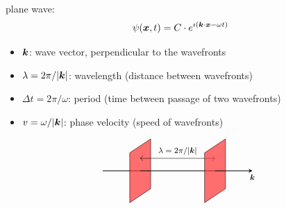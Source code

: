 plane wave:
\begin{equation}\label{eq:plane-wave}
\psi({\boldsymbol{x}}, t) = C \cdot e^{\imath ({\boldsymbol{k}} \cdot {\boldsymbol{x}} - \omega t)}
\end{equation}
\begin{itemize}
\item ${\boldsymbol{k}}$: wave vector, perpendicular to the wavefronts
\item $\lambda = 2 \pi / |{\boldsymbol{k}}|$: wavelength (distance between wavefronts)
\item $\Delta t = 2 \pi / \omega$: period (time between passage of two wavefronts)
\item $v = \omega / |{\boldsymbol{k}}|$: phase velocity (speed of wavefronts)
\end{itemize}
\[
\begin{tikzpicture}[
  scale=0.9,
  x={(1cm,0cm)},
  y={(0.42cm,0.28cm)},
  z={(0cm,1cm)},
  font=\footnotesize,
]

\def\lam{3}

\coordinate (P1) at (0,-1.0,-1.0);
\coordinate (P2) at (0, 1.0,-1.0);
\coordinate (P3) at (0, 1.0, 1.0);
\coordinate (P4) at (0,-1.0, 1.0);

\coordinate (Q1) at (\lam,-1.0,-1.0);
\coordinate (Q2) at (\lam, 1.0,-1.0);
\coordinate (Q3) at (\lam, 1.0, 1.0);
\coordinate (Q4) at (\lam,-1.0, 1.0);

\draw[thick] (-1.5,0,0) -- (0, 0,0);

\filldraw[fill=red!80, fill opacity=0.7, draw=black,] (P1) -- (P2) -- (P3) -- (P4) -- cycle;

\draw[thick] (0,0,0) -- (\lam, 0,0);

\draw[<->] (0,0,0.5) -- node[above=0pt] {$\lambda={2\pi}/{|\vect{k}|}$} (\lam,0,0.5);

\filldraw[fill=red!80, fill opacity=0.7, draw=black,] (Q1) -- (Q2) -- (Q3) -- (Q4) -- cycle;

\draw[-{stealth[length=2mm,width=1mm]}, thick] (\lam,0,0) -- (4.5,0,0) node[below] {$\vect{k}$};


\end{tikzpicture}
\]



